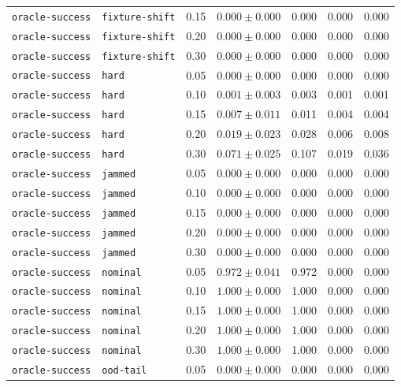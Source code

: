 \documentclass{article}
\begin{document}
\begin{center}
\begin{tabular}{lllcccc}
\texttt{oracle-success} & \texttt{fixture-shift} & 0.15 & $0.000 \pm 0.000$ & 0.000 & 0.000 & 0.000 \\
\texttt{oracle-success} & \texttt{fixture-shift} & 0.20 & $0.000 \pm 0.000$ & 0.000 & 0.000 & 0.000 \\
\texttt{oracle-success} & \texttt{fixture-shift} & 0.30 & $0.000 \pm 0.000$ & 0.000 & 0.000 & 0.000 \\
\texttt{oracle-success} & \texttt{hard} & 0.05 & $0.000 \pm 0.000$ & 0.000 & 0.000 & 0.000 \\
\texttt{oracle-success} & \texttt{hard} & 0.10 & $0.001 \pm 0.003$ & 0.003 & 0.001 & 0.001 \\
\texttt{oracle-success} & \texttt{hard} & 0.15 & $0.007 \pm 0.011$ & 0.011 & 0.004 & 0.004 \\
\texttt{oracle-success} & \texttt{hard} & 0.20 & $0.019 \pm 0.023$ & 0.028 & 0.006 & 0.008 \\
\texttt{oracle-success} & \texttt{hard} & 0.30 & $0.071 \pm 0.025$ & 0.107 & 0.019 & 0.036 \\
\texttt{oracle-success} & \texttt{jammed} & 0.05 & $0.000 \pm 0.000$ & 0.000 & 0.000 & 0.000 \\
\texttt{oracle-success} & \texttt{jammed} & 0.10 & $0.000 \pm 0.000$ & 0.000 & 0.000 & 0.000 \\
\texttt{oracle-success} & \texttt{jammed} & 0.15 & $0.000 \pm 0.000$ & 0.000 & 0.000 & 0.000 \\
\texttt{oracle-success} & \texttt{jammed} & 0.20 & $0.000 \pm 0.000$ & 0.000 & 0.000 & 0.000 \\
\texttt{oracle-success} & \texttt{jammed} & 0.30 & $0.000 \pm 0.000$ & 0.000 & 0.000 & 0.000 \\
\texttt{oracle-success} & \texttt{nominal} & 0.05 & $0.972 \pm 0.041$ & 0.972 & 0.000 & 0.000 \\
\texttt{oracle-success} & \texttt{nominal} & 0.10 & $1.000 \pm 0.000$ & 1.000 & 0.000 & 0.000 \\
\texttt{oracle-success} & \texttt{nominal} & 0.15 & $1.000 \pm 0.000$ & 1.000 & 0.000 & 0.000 \\
\texttt{oracle-success} & \texttt{nominal} & 0.20 & $1.000 \pm 0.000$ & 1.000 & 0.000 & 0.000 \\
\texttt{oracle-success} & \texttt{nominal} & 0.30 & $1.000 \pm 0.000$ & 1.000 & 0.000 & 0.000 \\
\texttt{oracle-success} & \texttt{ood-tail} & 0.05 & $0.000 \pm 0.000$ & 0.000 & 0.000 & 0.000 \\

\end{tabular}
\end{center}
\end{document}
